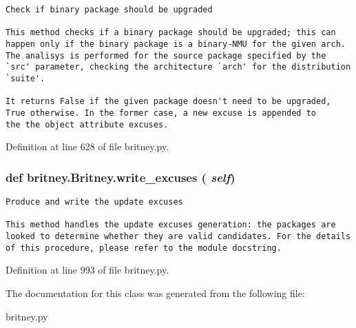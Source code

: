 \footnotesize\begin{verbatim}Check if binary package should be upgraded

This method checks if a binary package should be upgraded; this can
happen only if the binary package is a binary-NMU for the given arch.
The analisys is performed for the source package specified by the
`src' parameter, checking the architecture `arch' for the distribution
`suite'.
       
It returns False if the given package doesn't need to be upgraded,
True otherwise. In the former case, a new excuse is appended to
the the object attribute excuses.
\end{verbatim}
\normalsize
 

Definition at line 628 of file britney.py.
\subsubsection{\setlength{\rightskip}{0pt plus 5cm}def britney.Britney.write\_\-excuses ( {\em self})}\label{classbritney_1_1Britney_010f6deffca32f7f71ecf1f5c1bb4985}




\footnotesize\begin{verbatim}Produce and write the update excuses

This method handles the update excuses generation: the packages are
looked to determine whether they are valid candidates. For the details
of this procedure, please refer to the module docstring.
\end{verbatim}
\normalsize
 

Definition at line 993 of file britney.py.

The documentation for this class was generated from the following file:\begin{CompactItemize}
\item 
britney.py\end{CompactItemize}
